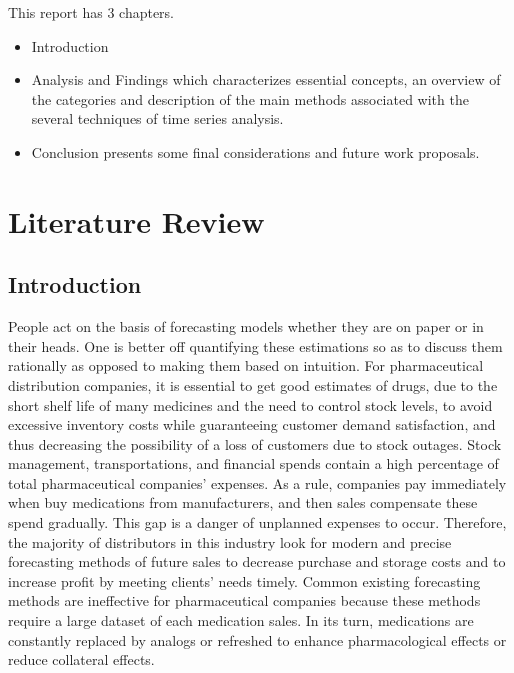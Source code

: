 \documentclass[12pt]{report}
\begin{document}
This report has 3 chapters. 

\begin{itemize}
	
	\item   Introduction
	\item   Analysis and Findings which characterizes essential concepts, an overview of the categories and description of the main methods associated with the several techniques of time series analysis.
	\item 	Conclusion presents some final considerations and future work proposals.
\end{itemize}
















\chapter{Literature Review}

\section{Introduction}

People act on the basis of forecasting models whether they are on paper or in their heads. One is better off quantifying these estimations so as to discuss them rationally as opposed to making them based on intuition. For pharmaceutical distribution companies, it is essential to get good estimates of drugs, due to the short shelf life of many medicines and the need to control stock levels, to avoid excessive inventory costs while guaranteeing customer demand satisfaction, and thus decreasing the possibility of a loss of customers due to stock outages.
Stock management, transportations, and financial spends contain a high percentage of total pharmaceutical companies’ expenses. As a rule, companies pay immediately when buy medications from manufacturers, and then sales compensate these spend gradually. This gap is a danger of unplanned expenses to occur. Therefore, the majority of distributors in this industry look for modern and precise forecasting methods of future sales to decrease purchase and storage costs and to increase profit by meeting clients’ needs timely.
Common existing forecasting methods are ineffective for pharmaceutical companies because these methods require a large dataset of each medication sales. In its turn, medications are constantly replaced by analogs or refreshed to enhance pharmacological effects or reduce collateral effects.
\end{document}
